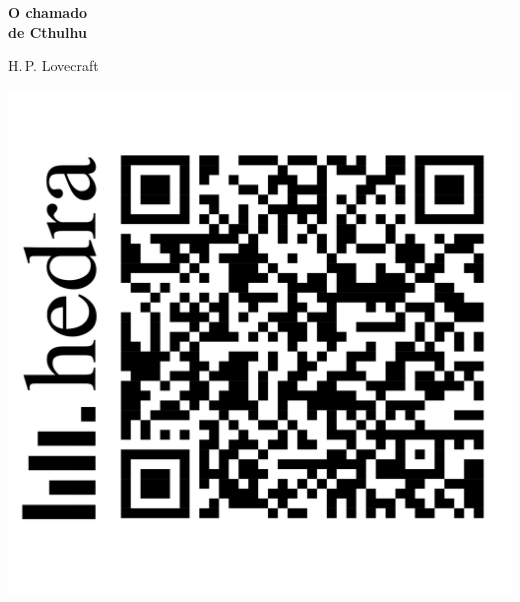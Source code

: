 




\begingroup\thispagestyle{empty}\vspace*{.05\textheight} 

              \formular
              \Huge
              \noindent
              \textbf{O chamado\\ de Cthulhu}
              
              {\brabo\LARGE
              \noindent H.\,P. Lovecraft}

\endgroup
\vfill

\begin{flushleft}
	\includegraphics[width=.3\textwidth]{img/hedra-audio-qr.png}
\end{flushleft}


\pagebreak
